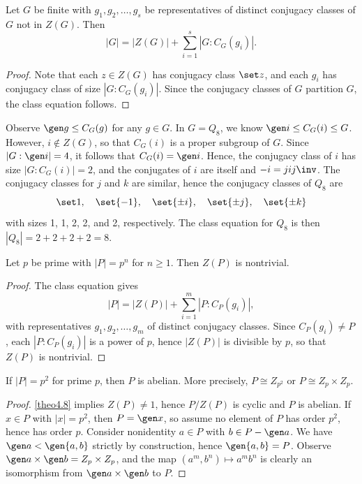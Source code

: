 \label{theo4.7}
Let $G$ be finite with $g_1, g_2, \ldots, g_s$ be representatives of distinct conjugacy classes of $G$ not in $Z(G)$. Then
\[|G| = |Z(G)| + \sum_{i=1}^s |G : C_G(g_i)|.\]
\begin{proof}
    Note that each $z \in Z(G)$ has conjugacy class $\set z$, and each $g_i$ has conjugacy class of size $|G : C_G(g_i)|$. Since the conjugacy classes of $G$ partition $G$, the class equation follows.
\end{proof}

\ex Observe $\gen g \leq C_G(g)$ for any $g \in G$. In $G = Q_8$, we know $\gen i \leq C_G(i) \leq G$. However, $i \not\in Z(G)$, so that $C_G(i)$ is a proper subgroup of $G$. Since $|G : \gen i| = 4$, it follows that $C_G(i) = \gen i$. Hence, the conjugacy class of $i$ has size $|G : C_G(i)| = 2$, and the conjugates of $i$ are itself and $-i = jij\inv$. The conjugacy classes for $j$ and $k$ are similar, hence the conjugacy classes of $Q_8$ are
\[\set 1, \quad \set{-1}, \quad \set{\pm i}, \quad \set{\pm j}, \quad \set{\pm k}\]
with sizes 1, 1, 2, 2, and 2, respectively. The class equation for $Q_8$ is then $|Q_8| = 2 + 2 + 2 + 2 = 8$.

 \label{theo4.8}
Let $p$ be prime with $|P| = p^n$ for $n \geq 1$. Then $Z(P)$ is nontrivial.
\begin{proof}
    The class equation gives
    \[|P| = |Z(P)| + \sum_{i=1}^m |P : C_P(g_i)|,\]
    with representatives $g_1, g_2, \ldots, g_m$ of distinct conjugacy classes. Since $C_P(g_i) \neq P$, each $|P : C_P(g_i)|$ is a power of $p$, hence $|Z(P)|$ is divisible by $p$, so that $Z(P)$ is nontrivial.
\end{proof}

 \label{cor4.9}
If $|P| = p^2$ for prime $p$, then $P$ is abelian. More precisely, $P \cong Z_{p^2}$ or $P \cong Z_p \times Z_p$.
\begin{proof}
    \autoref{theo4.8} implies $Z(P) \neq 1$, hence $P/Z(P)$ is cyclic and $P$ is abelian. If $x \in P$ with $|x| = p^2$, then $P = \gen x$, so assume no element of $P$ has order $p^2$, hence has order $p$. Consider nonidentity $a \in P$ with $b \in P - \gen a$. We have $\gen a < \gen{a, b}$ strictly by construction, hence $\gen{a, b} = P$. Observe $\gen a \times \gen b = Z_p \times Z_p$, and the map $(a^m, b^n) \mapsto a^mb^n$ is clearly an isomorphism from $\gen a \times \gen b$ to $P$.
\end{proof}

